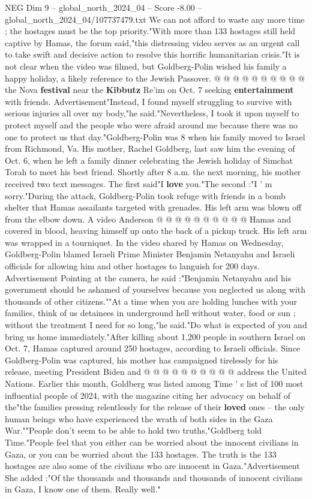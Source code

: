 \begin{textsample}{NEG Dim 9 – global\_north\_2024\_04 – Score -8.00 – global\_north\_2024\_04/107737479.txt}
We can not afford to waste any more time ; the hostages must be the top priority."With more than 133 hostages still held captive by Hamas, the forum said,"this distressing video serves as an urgent call to take swift and decisive action to resolve this horrific humanitarian crisis."It is not clear when the video was filmed, but Goldberg-Polin wished his family a happy holiday, a likely reference to the Jewish Passover. @ @ @ @ @ @ @ @ @ @ the Nova \textbf{festival} near the \textbf{Kibbutz} Re'im on Oct. 7 seeking \textbf{entertainment} with friends.
Advertisement"Instead, I found myself struggling to survive with serious injuries all over my body,"he said."Nevertheless, I took it upon myself to protect myself and the people who were afraid around me because there was no one to protect us that day."Goldberg-Polin was 8 when his family moved to Israel from Richmond, Va.
His mother, Rachel Goldberg, last saw him the evening of Oct. 6, when he left a family dinner celebrating the Jewish holiday of Simchat Torah to meet his best friend.
Shortly after 8 a.m. the next morning, his mother received two text messages.
The first said"I \textbf{love} you."The second :"I ' m sorry."During the attack, Goldberg-Polin took refuge with friends in a bomb shelter that Hamas assailants targeted with grenades.
His left arm was blown off from the elbow down.
A video Anderson @ @ @ @ @ @ @ @ @ @ Hamas and covered in blood, heaving himself up onto the back of a pickup truck.
His left arm was wrapped in a tourniquet.
In the video shared by Hamas on Wednesday, Goldberg-Polin blamed Israeli Prime Minister Benjamin Netanyahu and Israeli officials for allowing him and other hostages to languish for 200 days.
Advertisement Pointing at the camera, he said :"Benjamin Netanyahu and his government should be ashamed of yourselves because you neglected us along with thousands of other citizens.""At a time when you are holding lunches with your families, think of us detainees in underground hell without water, food or sun ; without the treatment I need for so long,"he said."Do what is expected of you and bring us home immediately."After killing about 1,200 people in southern Israel on Oct. 7, Hamas captured around 250 hostages, according to Israeli officials.
Since Goldberg-Polin was captured, his mother has campaigned tirelessly for his release, meeting President Biden and @ @ @ @ @ @ @ @ @ @ address the United Nations.
Earlier this month, Goldberg was listed among Time ' s list of 100 most influential people of 2024, with the magazine citing her advocacy on behalf of the"the families pressing relentlessly for the release of their \textbf{loved} ones -- the only human beings who have experienced the wrath of both sides in the Gaza War.""People don't seem to be able to hold two truths,"Goldberg told Time."People feel that you either can be worried about the innocent civilians in Gaza, or you can be worried about the 133 hostages.
The truth is the 133 hostages are also some of the civilians who are innocent in Gaza."Advertisement She added :"Of the thousands and thousands and thousands of innocent civilians in Gaza, I know one of them.
Really well."


\end{textsample}
